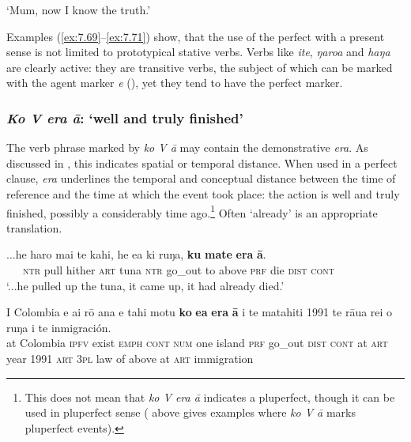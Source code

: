 \glt 
‘Mum, now I know the truth.’ \textstyleExampleref{[R229.495]} 
\z

Examples (\ref{ex:7.69}–\ref{ex:7.71}) show, that the use of the perfect  with a present sense is not limited to prototypical stative verbs. Verbs like \textit{{\ꞌ}ite}, \textit{ŋaro{\ꞌ}a} and \textit{haŋa} are clearly active: they are transitive verbs, the subject of which can be marked with the agent marker \textit{e} (), yet they tend to have the perfect  marker.

\subsubsection{\textit{Ko V era {\ꞌ}ā}: ‘well and truly finished’}\label{sec:7.2.7.3}
The verb phrase marked by \textit{ko V {\ꞌ}ā} may contain the demonstrative  \textit{era}. As discussed in , this  indicates spatial or temporal distance. When used in a perfect  clause, \textit{era} underlines the temporal and conceptual distance between the time of reference and the time at which the event took place: the action is well and truly finished, possibly a considerably time ago.\footnote{\label{fn:335}This does not mean that \textit{ko V era {\ꞌ}ā} indicates a pluperfect, though it can be used in pluperfect sense ( above gives examples where \textit{ko V {\ꞌ}ā} marks pluperfect events).} Often ‘already’ is an appropriate translation.

\ea\label{ex:7.72}
\gll ...he haro mai te kahi, he e{\ꞌ}a ki ruŋa, \textbf{ku} \textbf{mate} \textbf{era} \textbf{{\ꞌ}ā}. \\
~~~\textsc{ntr} pull hither \textsc{art} tuna \textsc{ntr} go\_out to above \textsc{prf} die \textsc{dist} \textsc{cont} \\

\glt 
‘...he pulled up the tuna, it came up, it had already died.’ \textstyleExampleref{[Ley-6-44.041]}
\z

\ea\label{ex:7.73}
\gll {\ꞌ}I Colombia e ai rō {\ꞌ}ana e tahi motu \textbf{ko} \textbf{e{\ꞌ}a} \textbf{era} \textbf{{\ꞌ}ā}  {\ꞌ}i te matahiti 1991 te rāua rei o ruŋa i te inmigración.\\
at Colombia \textsc{ipfv} exist \textsc{emph} \textsc{cont} \textsc{num} one island \textsc{prf} go\_out \textsc{dist} \textsc{cont}  at \textsc{art} year 1991 \textsc{art} \textsc{3pl} law of above at \textsc{art} immigration\\

